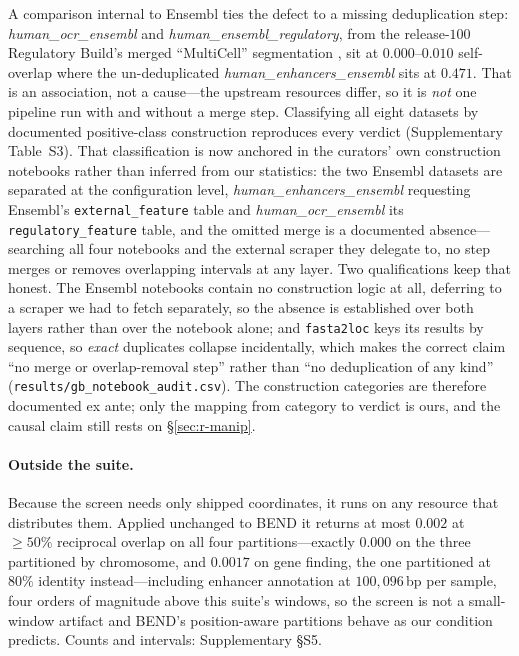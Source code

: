 \documentclass[webpdf,modern,large,namedate]{oup-authoring-template}%
\begin{document}
A comparison internal to Ensembl ties the defect to a missing deduplication step: \textit{human\_ocr\_ensembl} and \textit{human\_ensembl\_regulatory}, from the release-$100$ Regulatory Build's merged ``MultiCell'' segmentation \citep{zerbino2015regbuild}, sit at $0.000$--$0.010$ self-overlap where the un-deduplicated \textit{human\_enhancers\_ensembl} sits at $0.471$. That is an association, not a cause---the upstream resources differ, so it is \emph{not} one pipeline run with and without a merge step. Classifying all eight datasets by documented positive-class construction reproduces every verdict (Supplementary Table~S3). That classification is now anchored in the curators' own construction notebooks rather than inferred from our statistics: the two Ensembl datasets are separated at the configuration level, \textit{human\_enhancers\_ensembl} requesting Ensembl's \texttt{external\_feature} table and \textit{human\_ocr\_ensembl} its \texttt{regulatory\_feature} table, and the omitted merge is a documented absence---searching all four notebooks and the external scraper they delegate to, no step merges or removes overlapping intervals at any layer. Two qualifications keep that honest. The Ensembl notebooks contain no construction logic at all, deferring to a scraper we had to fetch separately, so the absence is established over both layers rather than over the notebook alone; and \texttt{fasta2loc} keys its results by sequence, so \emph{exact} duplicates collapse incidentally, which makes the correct claim ``no merge or overlap-removal step'' rather than ``no deduplication of any kind'' (\texttt{results/gb\_notebook\_audit.csv}). The construction categories are therefore documented ex ante; only the mapping from category to verdict is ours, and the causal claim still rests on \S\ref{sec:r-manip}.

\paragraph{Outside the suite.}\label{sec:r-bend} Because the screen needs only shipped coordinates, it runs on any resource that distributes them. Applied unchanged to BEND \citep{marin2024bend} it returns at most $0.002$ at $\ge50\%$ reciprocal overlap on all four partitions---exactly $0.000$ on the three partitioned by chromosome, and $0.0017$ on gene finding, the one partitioned at $80\%$ identity instead---including enhancer annotation at $100{,}096$\,bp per sample, four orders of magnitude above this suite's windows, so the screen is not a small-window artifact and BEND's position-aware partitions behave as our condition predicts. Counts and intervals: Supplementary \S S5.
\end{document}
